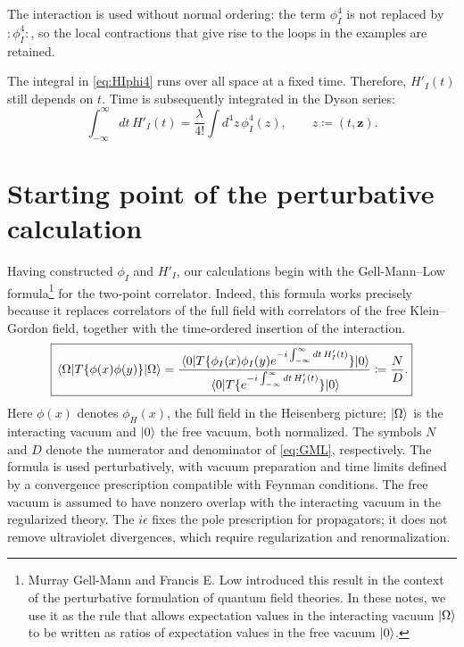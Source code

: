 \documentclass[11pt,letterpaper]{article}
\theoremstyle{definition}
\theoremstyle{definition}
\newcommand{\eqbox}[1]{\boxed{\displaystyle #1}}
\begin{document}
The interaction is used without normal ordering: the term $\phi_I^4$
is not replaced by $:\!\phi_I^4\!:$, so the local contractions that
give rise to the loops in the examples are retained.

The integral in \eqref{eq:HIphi4} runs over all space at a fixed time.
Therefore, $H'_I(t)$ still depends on $t$. Time is subsequently integrated
in the Dyson series:
\begin{equation}
  \eqbox{\int_{-\infty}^{\infty}dt\,H'_I(t)
  =\frac{\lambda}{4!}\int d^4z\,\phi_I^4(z),
  \qquad z\coloneqq(t,\mathbf{z}).}
  \label{eq:intHI}
\end{equation}

\section{Starting point of the perturbative calculation}

Having constructed $\phi_I$ and $H'_I$, our calculations begin with the
Gell-Mann--Low formula\footnote{Murray Gell-Mann and Francis E. Low
introduced this result in the context of the perturbative formulation
of quantum field theories. In these notes, we use it as the rule that
allows expectation values in the interacting vacuum $\ket{\Omega}$ to be
written as ratios of expectation values in the free vacuum $\ket{0}$.}
for the two-point correlator.
Indeed, this formula works precisely because it replaces correlators of
the full field with correlators of the free Klein--Gordon field, together
with the time-ordered insertion of the interaction.
\begin{equation}
  \boxed{\displaystyle
  \mel{\Omega}{T\{\phi(x)\phi(y)\}}{\Omega}
  =
  \frac{
    \mel{0}{T\{\phi_I(x)\phi_I(y)
    e^{-i\int_{-\infty}^{\infty}dt\,H'_I(t)}\}}{0}
  }{
    \mel{0}{T\{e^{-i\int_{-\infty}^{\infty}dt\,H'_I(t)}\}}{0}
  }
  \coloneqq\frac{N}{D}.}
  \label{eq:GML}
\end{equation}
Here $\phi(x)$ denotes $\phi_H(x)$, the full field in the Heisenberg
picture; $\ket{\Omega}$ is the interacting vacuum and $\ket{0}$ the free
vacuum, both normalized. The symbols $N$ and $D$ denote the numerator
and denominator of \eqref{eq:GML}, respectively.
The formula is used perturbatively, with vacuum preparation and time
limits defined by a convergence prescription compatible with Feynman
conditions. The free vacuum is assumed to have nonzero overlap with
the interacting vacuum in the regularized theory. The $i\epsilon$ fixes
the pole prescription for propagators; it does not remove ultraviolet
divergences, which require regularization and renormalization.
\end{document}
